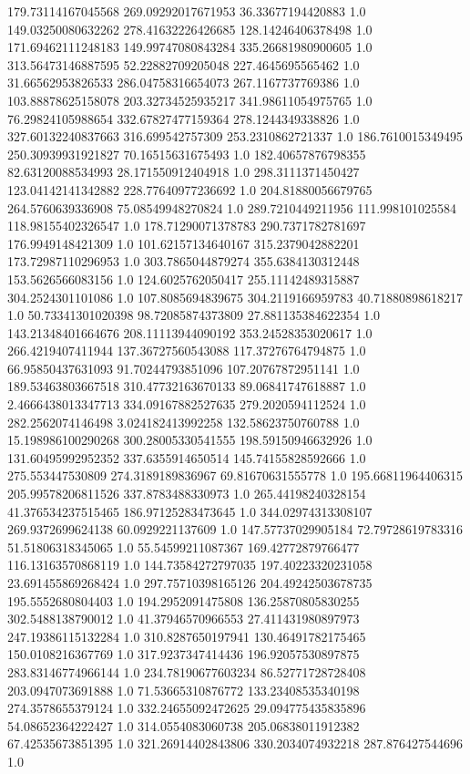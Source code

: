 179.73114167045568	269.09292017671953	36.33677194420883	1.0
149.03250080632262	278.41632226426685	128.14246406378498	1.0
171.69462111248183	149.99747080843284	335.26681980900605	1.0
313.56473146887595	52.22882709205048	227.4645695565462	1.0
31.66562953826533	286.04758316654073	267.1167737769386	1.0
103.88878625158078	203.32734525935217	341.98611054975765	1.0
76.29824105988654	332.67827477159364	278.1244349338826	1.0
327.60132240837663	316.699542757309	253.2310862721337	1.0
186.7610015349495	250.30939931921827	70.16515631675493	1.0
182.40657876798355	82.63120088534993	28.171550912404918	1.0
298.3111371450427	123.04142141342882	228.77640977236692	1.0
204.81880056679765	264.5760639336908	75.08549948270824	1.0
289.7210449211956	111.998101025584	118.98155402326547	1.0
178.71290071378783	290.7371782781697	176.9949148421309	1.0
101.62157134640167	315.2379042882201	173.72987110296953	1.0
303.7865044879274	355.6384130312448	153.5626566083156	1.0
124.6025762050417	255.11142489315887	304.2524301101086	1.0
107.8085694839675	304.2119166959783	40.71880898618217	1.0
50.73341301020398	98.72085874373809	27.881135384622354	1.0
143.21348401664676	208.11113944090192	353.24528353020617	1.0
266.4219407411944	137.36727560543088	117.37276764794875	1.0
66.95850437631093	91.70244793851096	107.20767872951141	1.0
189.53463803667518	310.47732163670133	89.06841747618887	1.0
2.4666438013347713	334.09167882527635	279.2020594112524	1.0
282.2562074146498	3.024182413992258	132.58623750760788	1.0
15.198986100290268	300.28005330541555	198.59150946632926	1.0
131.60495992952352	337.6355914650514	145.74155828592666	1.0
275.553447530809	274.3189189836967	69.81670631555778	1.0
195.66811964406315	205.99578206811526	337.8783488330973	1.0
265.44198240328154	41.376534237515465	186.97125283473645	1.0
344.02974313308107	269.9372699624138	60.0929221137609	1.0
147.57737029905184	72.79728619783316	51.51806318345065	1.0
55.54599211087367	169.42772879766477	116.13163570868119	1.0
144.73584272797035	197.40223320231058	23.691455869268424	1.0
297.75710398165126	204.49242503678735	195.5552680804403	1.0
194.2952091475808	136.25870805830255	302.5488138790012	1.0
41.37946570966553	27.411431980897973	247.19386115132284	1.0
310.8287650197941	130.46491782175465	150.0108216367769	1.0
317.9237347414436	196.92057530897875	283.83146774966144	1.0
234.78190677603234	86.52771728728408	203.0947073691888	1.0
71.53665310876772	133.23408535340198	274.3578655379124	1.0
332.24655092472625	29.094775435835896	54.08652364222427	1.0
314.0554083060738	205.06838011912382	67.42535673851395	1.0
321.26914402843806	330.2034074932218	287.876427544696	1.0
